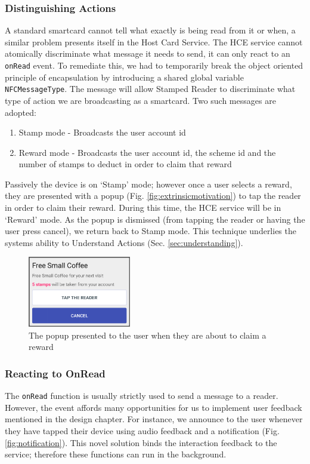 \subsubsection{Distinguishing Actions}
A standard smartcard cannot tell what exactly is being read from it or when, a similar problem presents itself in the Host Card Service. The HCE service cannot atomically discriminate what message it needs to send, it can only react to an \texttt{onRead} event. To remediate this, we had to temporarily break the object oriented principle of encapsulation by introducing a shared global variable \texttt{NFCMessageType}. The message will allow Stamped Reader to discriminate what type of action we are broadcasting as a smartcard. Two such messages are adopted:
\begin{enumerate}
 \item Stamp mode - Broadcasts the user account id
  \item Reward mode - Broadcasts the user account id, the scheme id and the number of stamps to deduct in order to claim that reward
\end{enumerate}
Passively the device is on `Stamp' mode; however once a user selects a reward, they are presented with a popup (Fig. \ref{fig:extrinsicmotivation}) to tap the reader in order to claim their reward. During this time, the HCE service will be in `Reward' mode. As the popup is dismissed (from tapping the reader or having the user press cancel), we return back to Stamp mode. This technique underlies the systems ability to Understand Actions (Sec. \ref{sec:understanding}).

\begin{figure}[H]
 \centering
  \includegraphics[width=0.40\textwidth]{img/claimreward.png}
     \caption{The popup presented to the user when they are about to claim a reward}
     \label{fig:claimreward}
\end{figure}

\subsubsection{Reacting to OnRead}
The \texttt{onRead} function is usually strictly used to send a message to a reader. However, the event affords many opportunities for us to implement user feedback mentioned in the design chapter. For instance, we announce to the user whenever they have tapped their device using audio feedback and a notification (Fig. \ref{fig:notification}). This novel solution binds the interaction feedback to the service; therefore these functions can run in the background.


